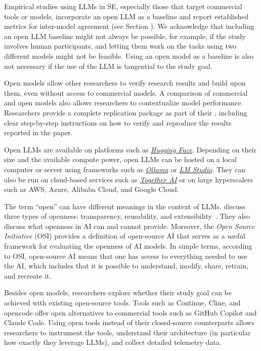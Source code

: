 
Empirical studies using LLMs in SE, especially those that target commercial tools or models, \should incorporate an open LLM as a baseline and report established metrics for inter-model agreement (see Section \benchmarksmetrics).
We acknowledge that including an open LLM baseline might not always be possible, for example, if the study involves human participants, and letting them work on the tasks using two different models might not be feasible.
Using an open model as a baseline is also not necessary if the use of the LLM is tangential to the study goal. %

Open models allow other researchers to verify research results and build upon them, even without access to commercial models.
A comparison of commercial and open models also allows researchers to contextualize model performance.
Researchers \should provide a complete replication package as part of their \supplementarymaterial, including clear step-by-step instructions on how to verify and reproduce the results reported in the paper.

Open LLMs are available on platforms such as \href{https://huggingface.co/}{\emph{Hugging Face}}.
Depending on their size and the available compute power, open LLMs can be hosted on a local computer or server using frameworks such as \href{https://ollama.com/}{\emph{Ollama}} or \href{https://lmstudio.ai/}{\emph{LM Studio}}.
They can also be run on cloud-based services such as \href{https://together.ai/}{\emph{Together AI}} or on large hyperscalers such as AWS, Azure, Alibaba Cloud, and Google Cloud.

The term ``open'' can have different meanings in the context of LLMs.
\citeauthor{widder2024open} discuss three types of openness: transparency, reusability, and extensibility~\cite{widder2024open}.
They also discuss what openness in AI can and cannot provide.
Moreover, the \emph{Open Source Initiative} (OSI) \cite{OSIAI2024} provides a definition of open-source AI that serves as a useful framework for evaluating the openness of AI models.
In simple terms, according to OSI, open-source AI means that one has access to everything needed to use the AI, which includes that it is possible to understand, modify, share, retrain, and recreate it.

Besides open models, researchers \may explore whether their study goal can be achieved with existing open-source tools.
Tools such as Continue, Cline, and opencode offer open alternatives to commercial tools such as GitHub Copilot and Claude Code.
Using open tools instead of their closed-source counterparts allows researchers to instrument the tools, understand their architecture (in particular how exactly they leverage LLMs), and collect detailed telemetry data.

